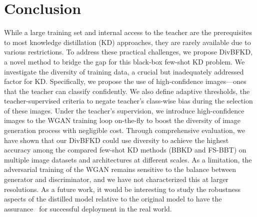 \section{Conclusion} \label{sec:34-research01-conclusion}

\begin{foldable}
  While a large training set and internal access to the teacher are the prerequisites to most knowledge distillation (KD) approaches, they are rarely available due to various restrictions.
  To address these practical challenges, we propose DivBFKD, a novel method to bridge the gap for this black-box few-shot \ac{KD} problem.
  We investigate the diversity of training data, a crucial but inadequately addressed factor for \ac{KD}.
  Specifically, we propose the use of high-confidence images---ones that the teacher can classify confidently.
  We also define adaptive thresholds, the teacher-supervised criteria to negate teacher's class-wise bias during the selection of these images.
  Under the teacher's supervision, we introduce high-confidence images to the WGAN training loop on-the-fly to boost the diversity of image generation process with negligible cost.
  Through comprehensive evaluation, we have shown that our DivBFKD could use diversity to achieve the highest accuracy among the compared few-shot \ac{KD} methods (BBKD and FS-BBT) on multiple image datasets and architectures at different scales.
  As a limitation, the adversarial training of the WGAN remains sensitive to the balance between generator and discriminator, and we have not characterized this at larger resolutions.
  As a future work, it would be interesting to study the robustness aspects of the distilled model relative to the original model to have the assurance~\cite{gopakumar2018algorithmic} for successful deployment in the real world.
\end{foldable}
